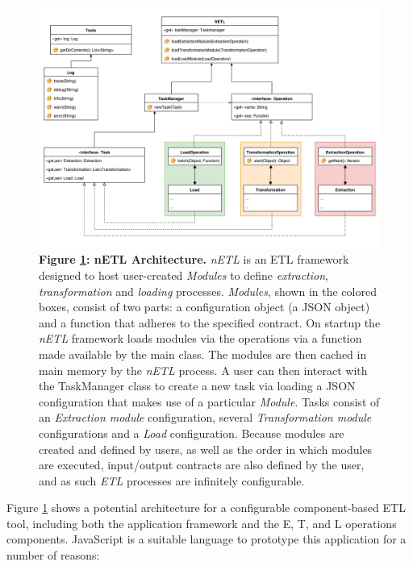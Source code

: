 \begin{figure}[H]
    \centering
    \begin{mdframed}
        \centering
        \includegraphics[scale=0.092]{./resources/figures/netlUML.png}
    \end{mdframed}
    \caption[nETL Architecture]{\textbf{Figure \ref{nETL}: nETL Architecture.} \textit{nETL} is an ETL framework designed to host user-created \textit{Modules} to define \textit{extraction}, \textit{transformation} and \textit{loading} processes. \textit{Modules}, shown in the colored boxes, consist of two parts: a configuration object (a JSON object) and a function that adheres to the specified contract. On startup the \textit{nETL} framework loads modules via the operations via a function made available by the main class. The modules are then cached in main memory by the \textit{nETL} process. A user can then interact with the TaskManager class to create a new task via loading a JSON configuration that makes use of a particular \textit{Module}. Tasks consist of an \textit{Extraction module} configuration, several \textit{Transformation module} configurations and a \textit{Load} configuration. Because modules are created and defined by users, as well as the order in which modules are executed, input/output contracts are also defined by the user, and as such \textit{ETL} processes are infinitely configurable.}
    \label{nETL}
\end{figure}

Figure \ref{nETL} shows a potential architecture for a configurable component-based ETL tool, including both the application framework and the E, T, and L operations components. JavaScript is a suitable language to prototype this application for a number of reasons:

